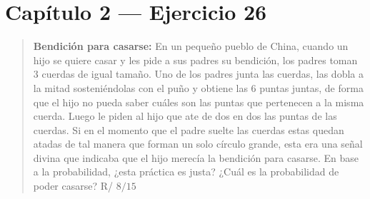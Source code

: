 \documentclass[11pt]{article}
\begin{document}
\section*{Cap\'itulo 2 --- Ejercicio 26}

\begin{quote}
\textbf{Bendici\'on para casarse:} En un peque\~no pueblo de China, cuando un hijo se quiere casar y les pide a sus padres su bendici\'on, los padres toman 3 cuerdas de igual tama\~no. Uno de los padres junta las cuerdas, las dobla a la mitad sosteni\'endolas con el pu\~no y obtiene las 6 puntas juntas, de forma que el hijo no pueda saber cu\'ales son las puntas que pertenecen a la misma cuerda. Luego le piden al hijo que ate de dos en dos las puntas de las cuerdas. Si en el momento que el padre suelte las cuerdas estas quedan atadas de tal manera que forman un solo c\'irculo grande, esta era una se\~nal divina que indicaba que el hijo merec\'ia la bendici\'on para casarse. En base a la probabilidad, ¿esta pr\'actica es justa? ¿Cu\'al es la probabilidad de poder casarse? \hfill R/ $8/15$
\end{quote}
\end{document}
